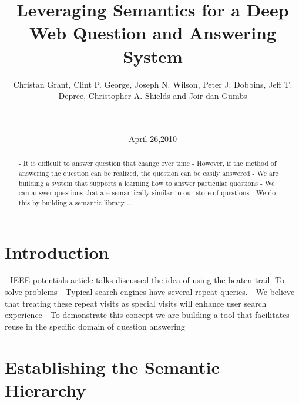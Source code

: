 \documentclass{www2010-submission}
\begin{document}
\title{Leveraging Semantics for a Deep Web Question and Answering System} 
\author{
	 \alignauthor Christan Grant, Clint P. George, Joseph N. Wilson, Peter J. Dobbins, Jeff T. Depree, Christopher A. Shields and Joir-dan Gumbs\\
	  \\  \\
}
\date{April 26,2010}

\maketitle

\begin{abstract}
- It is difficult to answer question that change over time
- However, if the method of answering the question can be realized, the question can be easily answered
- We are building a system that supports a learning how to answer particular questions
- We can answer questions that are semantically similar to our store of questions
- We do this by building a semantic library ...
\end{abstract}




\section{Introduction}
- IEEE potentials article talks discussed the idea of using the beaten trail. \cite{5379671} To solve problems
- Typical search engines have several repeat queries.
- We believe that treating these repeat visits as special visits will enhance user search experience
- To demonstrate this concept we are building a tool that facilitates reuse in the specific domain of question answering

\section{Establishing the Semantic Hierarchy}
\end{document}
